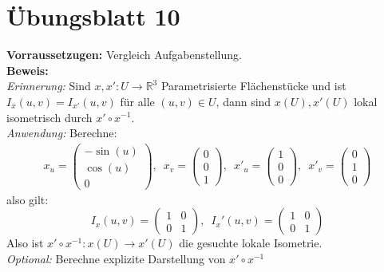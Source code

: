 %
\section{Übungsblatt 10}

\begin{problem*}[1]
  \textbf{Vorraussetzugen:} Vergleich Aufgabenstellung. \\
  \textbf{Beweis:} \\
  \emph{Erinnerung:} Sind \( x, x': U \to \mathbb{R}^3 \) Parametrisierte Flächenstücke und ist \( I_x(u,v) = I_{x'}(u,v) \) für alle \( (u,v) \in U \), dann sind \( x(U), x'(U) \) lokal isometrisch durch \( x' \circ x^{-1} \). \\
  \emph{Anwendung:} Berechne: \\
  \begin{align*}
    x_u = \begin{pmatrix}	
      -\sin(u) \\ \cos(u) \\ 0	
    \end{pmatrix},\enspace
    x_v = \begin{pmatrix}	
      0 \\ 0 \\ 1	
    \end{pmatrix},\enspace
		{x'}_u = \begin{pmatrix}	
      1 \\ 0 \\ 0	
    \end{pmatrix},\enspace
    {x'}_v= \begin{pmatrix}	
      0 \\ 1 \\ 0	
    \end{pmatrix}
  \end{align*}
  also gilt:
  \begin{equation*}
    I_x(u,v) = \begin{pmatrix}
      1 & 0 \\
      0 & 1
    \end{pmatrix}, \enspace
		I_x'(u,v) = \begin{pmatrix}
      1 & 0 \\
      0 & 1
    \end{pmatrix}
  \end{equation*}
  Also ist \( x' \circ x^{-1}: x(U) \to x'(U) \) die gesuchte lokale Isometrie. \\
  \emph{Optional:} Berechne explizite Darstellung von \( x' \circ x^{-1} \)
\end{problem*}

